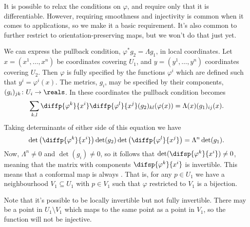 \documentclass[fleqn]{NotesClass}
\begin{document}
    \begin{remark}{}{}
        It is possible to relax the conditions on \(\varphi\), and require only that it is differentiable.
        However, requiring smoothness and injectivity is common when it comes to applications, so we make it a basic requirement.
        It's also common to further restrict to orientation-preserving maps, but we won't do that just yet.
    \end{remark}
    
    We can express the pullback condition, \(\varphi^*g_2 = \Lambda g_1\), in local coordinates.
    Let \(x = (x^1, \dotsc, x^n)\) be coordinates covering \(U_1\), and \(y = (y^1, \dotsc, y^n)\) coordinates covering \(U_2\).
    Then \(\varphi\) is fully specified by the functions \(\varphi^i\) which are defined such that \(y^i = \varphi^i(x)\).
    The metrics, \(g_i\), may be specified by their components, \((g_i)_{jk} \colon U_i \to \reals\).
    In these coordinates the pullback condition becomes
    \begin{equation}
        \sum_{k,l} \diffp{\varphi^k}{x^i} \diffp{\varphi^l}{x^j} (g_2)_{kl}(\varphi(x)) = \Lambda(x) (g_1)_{ij}(x).
    \end{equation}
    Taking determinants of either side of this equation we have
    \begin{equation}
        \det\left( \diffp{\varphi^k}{x^i} \right) \det(g_2) \det\left( \diffp{\varphi^l}{x^j} \right) = \Lambda^n \det (g_1).
    \end{equation}
    Now, \(\Lambda^n \ne 0\) and \(\det(g_i) \ne 0\), so it follows that \(\det(\difsp{\varphi^k}{x^i}) \ne 0\), meaning that the matrix with components \(\difsp{\varphi^k}{x^i}\) is invertible.
    This means that a conformal map is always .
    That is, for any \(p \in U_1\) we have a neighbourhood \(V_1 \subseteq U_1\) with \(p \in V_1\) such that \(\varphi\) restricted to \(V_1\) is a bijection.
    
    Note that it's possible to be locally invertible but not fully invertible.
    There may be a point in \(U_1 \setminus V_1\) which maps to the same point as a point in \(V_1\), so the function will not be injective.
    
\end{document}
